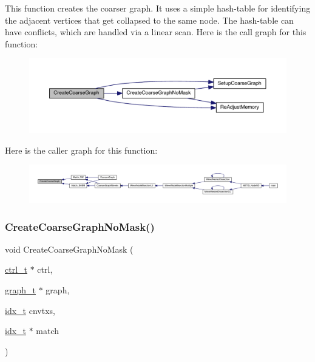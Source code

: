 This function creates the coarser graph. It uses a simple hash-\/table for identifying the adjacent vertices that get collapsed to the same node. The hash-\/table can have conflicts, which are handled via a linear scan. Here is the call graph for this function\+:\nopagebreak
\begin{figure}[H]
\begin{center}
\leavevmode
\includegraphics[width=350pt]{a00182_aac8820421b1c25698140c1b470c50e07_cgraph}
\end{center}
\end{figure}
Here is the caller graph for this function\+:\nopagebreak
\begin{figure}[H]
\begin{center}
\leavevmode
\includegraphics[width=350pt]{a00182_aac8820421b1c25698140c1b470c50e07_icgraph}
\end{center}
\end{figure}
\mbox{\label{a00182_a70dc59d4c7190507e7ad9a4cc0d80707}} 
\subsubsection{\texorpdfstring{Create\+Coarse\+Graph\+No\+Mask()}{CreateCoarseGraphNoMask()}}
{\footnotesize\ttfamily void Create\+Coarse\+Graph\+No\+Mask (\begin{DoxyParamCaption}\item[{\hyperlink{a00742}{ctrl\+\_\+t} $\ast$}]{ctrl,  }\item[{\hyperlink{a00734}{graph\+\_\+t} $\ast$}]{graph,  }\item[{\hyperlink{a00876_aaa5262be3e700770163401acb0150f52}{idx\+\_\+t}}]{cnvtxs,  }\item[{\hyperlink{a00876_aaa5262be3e700770163401acb0150f52}{idx\+\_\+t} $\ast$}]{match }\end{DoxyParamCaption})}

